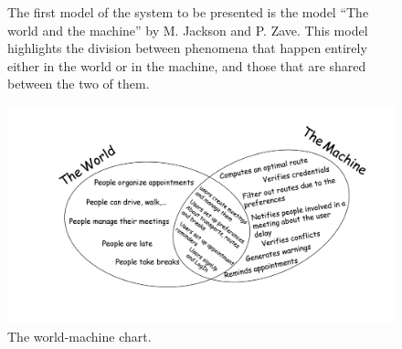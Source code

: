 \begin{figure}[htp]
	\begin{flushleft}
		The first model of the system to be presented is the model ``The world and the machine'' by M. Jackson and P. Zave. This model highlights the division between phenomena that happen entirely either in the world or in the machine, and those that are shared between the two of them.
	\end{flushleft}
	\centering
	\includegraphics[scale=0.14]{images/World-Machine}
	\caption{The world-machine chart.}
	\label{fig:world-machine}
\end{figure}
